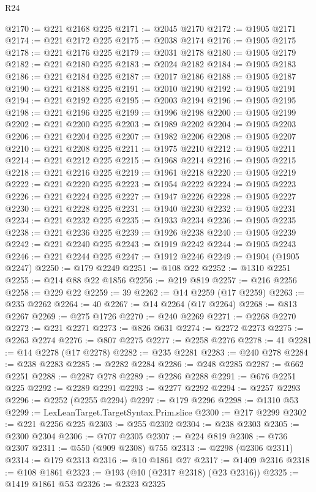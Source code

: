 \begin{lexlean}{R24}
\begin{coremodule}
@2170 := @221 @2168 @225
@2171 := @2045 @2170
@2172 := @1905 @2171
@2174 := @221 @2172 @225
@2175 := @2038 @2174
@2176 := @1905 @2175
@2178 := @221 @2176 @225
@2179 := @2031 @2178
@2180 := @1905 @2179
@2182 := @221 @2180 @225
@2183 := @2024 @2182
@2184 := @1905 @2183
@2186 := @221 @2184 @225
@2187 := @2017 @2186
@2188 := @1905 @2187
@2190 := @221 @2188 @225
@2191 := @2010 @2190
@2192 := @1905 @2191
@2194 := @221 @2192 @225
@2195 := @2003 @2194
@2196 := @1905 @2195
@2198 := @221 @2196 @225
@2199 := @1996 @2198
@2200 := @1905 @2199
@2202 := @221 @2200 @225
@2203 := @1989 @2202
@2204 := @1905 @2203
@2206 := @221 @2204 @225
@2207 := @1982 @2206
@2208 := @1905 @2207
@2210 := @221 @2208 @225
@2211 := @1975 @2210
@2212 := @1905 @2211
@2214 := @221 @2212 @225
@2215 := @1968 @2214
@2216 := @1905 @2215
@2218 := @221 @2216 @225
@2219 := @1961 @2218
@2220 := @1905 @2219
@2222 := @221 @2220 @225
@2223 := @1954 @2222
@2224 := @1905 @2223
@2226 := @221 @2224 @225
@2227 := @1947 @2226
@2228 := @1905 @2227
@2230 := @221 @2228 @225
@2231 := @1940 @2230
@2232 := @1905 @2231
@2234 := @221 @2232 @225
@2235 := @1933 @2234
@2236 := @1905 @2235
@2238 := @221 @2236 @225
@2239 := @1926 @2238
@2240 := @1905 @2239
@2242 := @221 @2240 @225
@2243 := @1919 @2242
@2244 := @1905 @2243
@2246 := @221 @2244 @225
@2247 := @1912 @2246
@2249 := @1904 (@1905 @2247)
@2250 := @179 @2249
@2251 := @108 @22
@2252 := @1310 @2251
@2255 := @214 @88 @22 @1856
@2256 := @219 @819
@2257 := @216 @2256
@2258 := @229 @22
@2259 := 39
@2262 := @14 @2259 (@17 @2259)
@2263 := @235 @2262
@2264 := 40
@2267 := @14 @2264 (@17 @2264)
@2268 := @813 @2267
@2269 := @275 @1726
@2270 := @240 @2269
@2271 := @2268 @2270
@2272 := @221 @2271
@2273 := @826 @631
@2274 := @2272 @2273
@2275 := @2263 @2274
@2276 := @807 @2275
@2277 := @2258 @2276
@2278 := 41
@2281 := @14 @2278 (@17 @2278)
@2282 := @235 @2281
@2283 := @240 @278
@2284 := @238 @2283
@2285 := @2282 @2284
@2286 := @248 @2285
@2287 := @662 @2251
@2288 := @2287 @278
@2289 := @2286 @2288
@2291 := @676 @2251 @225
@2292 := @2289 @2291
@2293 := @2277 @2292
@2294 := @2257 @2293
@2296 := @2252 (@2255 @2294)
@2297 := @179 @2296
@2298 := @1310 @53
@2299 := LexLeanTarget.TargetSyntax.Prim.slice
@2300 := @217 @2299
@2302 := @221 @2256 @225
@2303 := @255 @2302
@2304 := @238 @2303
@2305 := @2300 @2304
@2306 := @707 @2305
@2307 := @224 @819
@2308 := @736 @2307
@2311 := @550 (@909 @2308) @755
@2313 := @2298 (@2306 @2311)
@2314 := @179 @2313
@2316 := @10 @1861 @27
@2317 := @1409 @2316
@2318 := @108 @1861
@2323 := @193 (@10 (@2317 @2318) (@23 @2316))
@2325 := @1419 @1861 @53
@2326 := @2323 @2325

\end{coremodule}
\end{lexlean}
